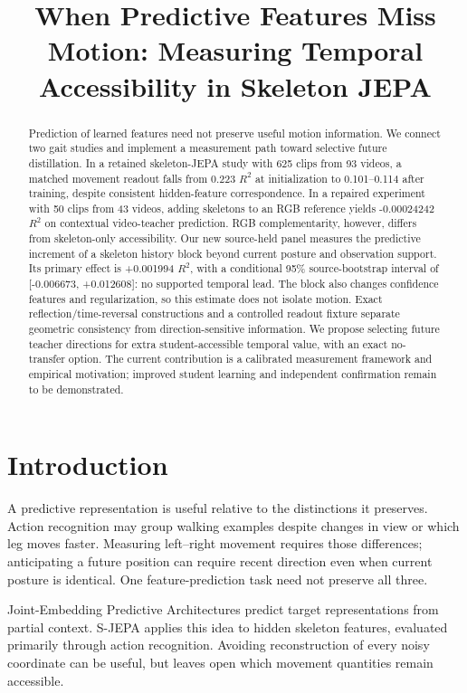 \documentclass{article}
\title{When Predictive Features Miss Motion: Measuring Temporal Accessibility in Skeleton JEPA}
\begin{document}
\maketitle
\begin{abstract}
Prediction of learned features need not preserve useful motion information. We connect two gait studies and implement a measurement path toward selective future distillation. In a retained skeleton-JEPA study with 625 clips from 93 videos, a matched movement readout falls from 0.223 \(R^2\) at initialization to 0.101--0.114 after training, despite consistent hidden-feature correspondence. In a repaired experiment with 50 clips from 43 videos, adding skeletons to an RGB reference yields -0.00024242 \(R^2\) on contextual video-teacher prediction. RGB complementarity, however, differs from skeleton-only accessibility. Our new source-held panel measures the predictive increment of a skeleton history block beyond current posture and observation support. Its primary effect is +0.001994 \(R^2\), with a conditional 95\% source-bootstrap interval of {[}-0.006673, +0.012608{]}: no supported temporal lead. The block also changes confidence features and regularization, so this estimate does not isolate motion. Exact reflection/time-reversal constructions and a controlled readout fixture separate geometric consistency from direction-sensitive information. We propose selecting future teacher directions for extra student-accessible temporal value, with an exact no-transfer option. The current contribution is a calibrated measurement framework and empirical motivation; improved student learning and independent confirmation remain to be demonstrated.
\end{abstract}
\section{Introduction}\label{introduction}

A predictive representation is useful relative to the distinctions it preserves. Action recognition may group walking examples despite changes in view or which leg moves faster. Measuring left--right movement requires those differences; anticipating a future position can require recent direction even when current posture is identical. One feature-prediction task need not preserve all three.

Joint-Embedding Predictive Architectures predict target representations from partial context. S-JEPA \citep{abdelfattah2024sjepa} applies this idea to hidden skeleton features, evaluated primarily through action recognition. Avoiding reconstruction of every noisy coordinate can be useful, but leaves open which movement quantities remain accessible.
\end{document}
